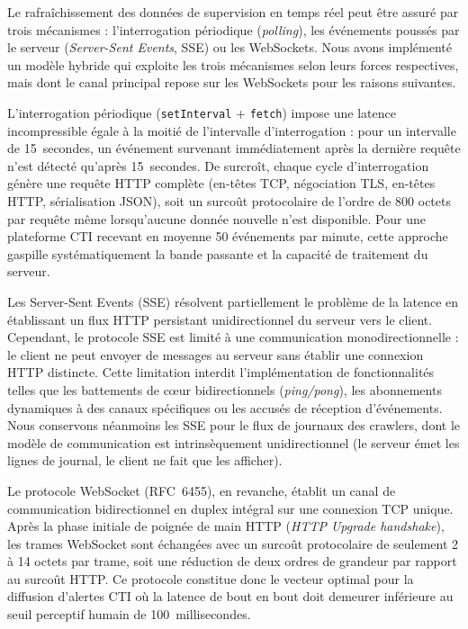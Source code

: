 Le rafraîchissement des données de supervision en temps réel peut être assuré par trois mécanismes : l'interrogation périodique (\textit{polling}), les événements poussés par le serveur (\textit{Server-Sent Events}, SSE) ou les WebSockets. Nous avons implémenté un modèle hybride qui exploite les trois mécanismes selon leurs forces respectives, mais dont le canal principal repose sur les WebSockets pour les raisons suivantes.

L'interrogation périodique (\texttt{setInterval} + \texttt{fetch}) impose une latence incompressible égale à la moitié de l'intervalle d'interrogation : pour un intervalle de 15~secondes, un événement survenant immédiatement après la dernière requête n'est détecté qu'après 15~secondes. De surcroît, chaque cycle d'interrogation génère une requête HTTP complète (en-têtes TCP, négociation TLS, en-têtes HTTP, sérialisation JSON), soit un surcoût protocolaire de l'ordre de 800 octets par requête même lorsqu'aucune donnée nouvelle n'est disponible. Pour une plateforme CTI recevant en moyenne 50 événements par minute, cette approche gaspille systématiquement la bande passante et la capacité de traitement du serveur.

Les Server-Sent Events (SSE) résolvent partiellement le problème de la latence en établissant un flux HTTP persistant unidirectionnel du serveur vers le client. Cependant, le protocole SSE est limité à une communication monodirectionnelle : le client ne peut envoyer de messages au serveur sans établir une connexion HTTP distincte. Cette limitation interdit l'implémentation de fonctionnalités telles que les battements de cœur bidirectionnels (\textit{ping/pong}), les abonnements dynamiques à des canaux spécifiques ou les accusés de réception d'événements. Nous conservons néanmoins les SSE pour le flux de journaux des crawlers, dont le modèle de communication est intrinsèquement unidirectionnel (le serveur émet les lignes de journal, le client ne fait que les afficher).

Le protocole WebSocket (RFC~6455), en revanche, établit un canal de communication bidirectionnel en duplex intégral sur une connexion TCP unique. Après la phase initiale de poignée de main HTTP (\textit{HTTP Upgrade handshake}), les trames WebSocket sont échangées avec un surcoût protocolaire de seulement 2 à 14 octets par trame, soit une réduction de deux ordres de grandeur par rapport au surcoût HTTP. Ce protocole constitue donc le vecteur optimal pour la diffusion d'alertes CTI où la latence de bout en bout doit demeurer inférieure au seuil perceptif humain de 100~millisecondes.

